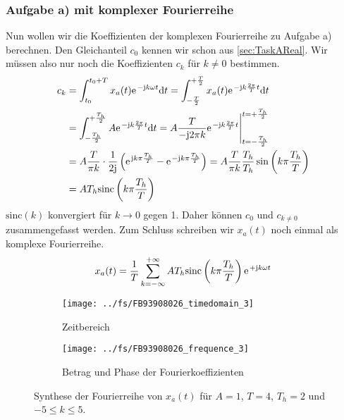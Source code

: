 \documentclass[11pt,a4paper,DIV=12]{scrartcl}
\newcommand{\diff}{\mathrm{d}}
\newcommand{\sinc}{\mathrm{sinc}}
\begin{document}
\subsubsection*{Aufgabe a) mit komplexer Fourierreihe}
Nun wollen wir die Koeffizienten der komplexen Fourierreihe zu Aufgabe a)
berechnen. Den Gleichanteil $c_0$ kennen wir schon aus \ref{sec:TaskAReal}.
%
Wir müssen also nur noch die Koeffizienten $c_k$ für $k\neq 0$ bestimmen.
%
\begin{align}
	c_k&=\int_{t_0}^{t_0+T}x_{a}(t)\e^{-\im k \omega t}\diff t
	=\int_{-\frac{T}{2}}^{+\frac{T}{2}}x_a(t)\e^{-\im k \frac{2\pi}{T}t}\diff t\nonumber\\
	&=\int_{-\frac{T_h}{2}}^{+\frac{T_h}{2}}A\e^{-\im k \frac{2\pi}{T}t}\diff t
	=A\frac{T}{-\im 2\pi k}\e^{-\im k \frac{2\pi}{T}t}\Bigg |_{t=-\frac{T_h}{2}}^{t=+\frac{T_h}{2}}\nonumber\\
	&=A\frac{T}{\pi k}\cdot\frac{1}{2\im}\left (\e^{\im k \pi \frac{T_h}{T}}-\e^{-\im k \pi \frac{T_h}{T}}\right )
	=A\frac{T}{\pi k}\frac{T_h}{T_h}\sin\left(k\pi\frac{T_h}{T}\right)\nonumber\\
	&=AT_h\sinc\left(k\pi\frac{T_h}{T}\right)
\end{align}
%
$\sinc(k)$ konvergiert für $k\rightarrow0$ gegen 1.
%
Daher können $c_0$ und $c_{k\neq0}$ zusammengefasst werden.
%
Zum Schluss schreiben wir $x_{a}(t)$ noch einmal als komplexe Fourierreihe.
%
\begin{align}
	x_{a}(t)=\frac{1}{T}\sum_{k=-\infty}^{+\infty}AT_h\sinc\left(k\pi\frac{T_h}{T}\right)\e^{+\im k \omega t}
\end{align}
%

%
\begin{figure}
	\centering
	\begin{subfigure}{\textwidth}
		\texttt{[image: ../fs/FB93908026\_timedomain\_3]}
		\caption{Zeitbereich}
	\end{subfigure}
	\begin{subfigure}{\textwidth}
		\texttt{[image: ../fs/FB93908026\_frequence\_3]}
		\caption{Betrag und Phase der Fourierkoeffizienten}
	\end{subfigure}
	\caption{Synthese der Fourierreihe von $x_a(t)$ für $A=1$, $T=4$, $T_h=2$ und
		$-5\leq k\leq5$.}
\end{figure}
\newpage
\end{document}
